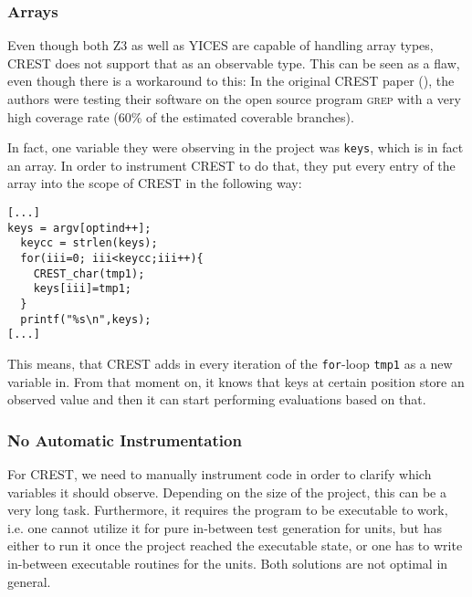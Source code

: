 \documentclass[oribibl]{llncs}
\begin{document}
\subsubsection{Arrays}

Even though both \textsc{Z3} as well as \textsc{YICES} are capable of
handling array types, \textsc{CREST} does not support that as an
observable type. This can be seen as a flaw, even though there is a
workaround to this: In the original \textsc{CREST} paper
(\cite{CREST}), the authors were testing their software on the open
source program \textsc{grep} with a very high coverage rate (60\% of
the estimated coverable branches).

In fact, one variable they were observing in the project was \texttt{keys}, which is in fact an array. In order to
instrument \textsc{CREST} to do that, they put every entry of the
array into the scope of \textsc{CREST} in the following way:

\begin{verbatim}
[...]
keys = argv[optind++];
  keycc = strlen(keys);
  for(iii=0; iii<keycc;iii++){
    CREST_char(tmp1);
    keys[iii]=tmp1;
  }
  printf("%s\n",keys);
[...]
\end{verbatim}

This means, that \textsc{CREST} adds in every iteration of the
\texttt{for}-loop \texttt{tmp1} as a new variable in. From that moment on, it
knows that keys at certain position store an observed value and then
it can start performing evaluations based on that.

\subsubsection{No Automatic Instrumentation}

For \textsc{CREST}, we need to manually instrument code in order to
clarify which variables it should observe. Depending on the size of
the project, this can be a very long task.  Furthermore, it requires
the program to be executable to work, i.e. one cannot utilize it for
pure in-between test generation for units, but has either to run it once
the project reached the executable state, or one has to write in-between executable routines for the units. Both solutions are not
optimal in general.



\end{document}
